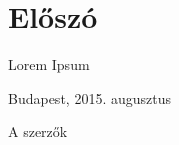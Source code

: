 \section*{Előszó}

Lorem Ipsum

\nopagebreak
Budapest, 2015. augusztus

\nopagebreak\vspace{-1em}
\begin{flushright}
	A szerzők
\end{flushright}\vspace{-2em}
